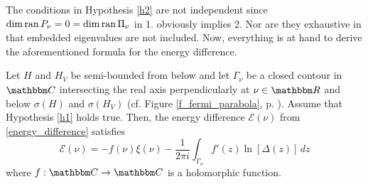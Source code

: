 The conditions in Hypothesis \ref{h2} are not independent since $\dim\operatorname{ran} P_\nu=0=\dim\operatorname{ran}\Pi_\nu$ in 1.
obviously implies 2. Nor are they exhaustive in that embedded eigenvalues are not included.
Now, everything is at hand to derive the aforementioned formula for the energy difference.

\begin{proposition}\label{energy01t}
Let $H$ and $H_V$ be semi-bounded from below and let $\Gamma_\nu$ be a closed contour in $\C$ 
intersecting the real axis perpendicularly at $\nu\in\R$ and below $\sigma(H)$ and $\sigma(H_V)$ 
(cf. Figure \ref{f_fermi_parabola}, p. \pageref{f_fermi_parabola}).
Assume that Hypothesis \ref{h1} holds true.
Then, the energy difference $\mathcal{E}(\nu)$ from \eqref{energy_difference} satisfies
\begin{equation}\label{energy01t01}
  \mathcal{E}(\nu)
      =   - f(\nu)\xi(\nu) - \frac{1}{2\pi i} \int_{\Gamma_\nu} f'(z) \ln[\Delta(z)]\, dz
\end{equation}
where $f:\C\to\C$ is a holomorphic function. 
\end{proposition}
